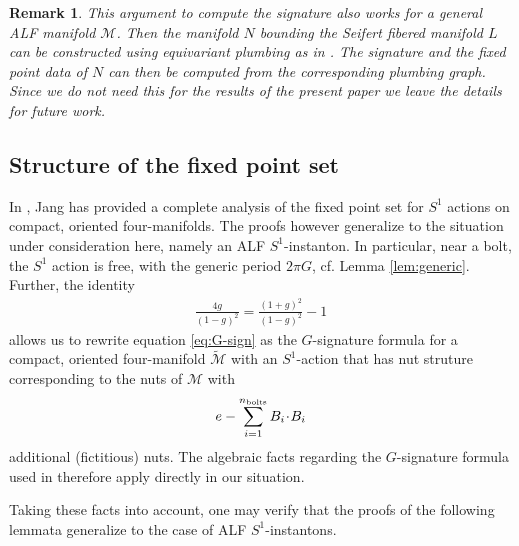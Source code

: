 \documentclass[a4paper,10pt,reqno]{amsart}
\newcommand{\bolt}{B}
\newcommand{\cM}{\mathcal{M}}
\theoremstyle{plain}
\newtheorem{remark}[thm]{Remark}
\newcommand{\nbolts}{n_{\text{\rm bolts}}}
\numberwithin{equation}{section}
\begin{document}
\begin{remark}
This argument to compute the signature also works for a general ALF manifold $\cM$. Then the manifold $N$ bounding the Seifert fibered manifold $L$ can be constructed using equivariant plumbing as in \cite[Chapter~2]{Orlik-seifert-manifolds}. The signature and the fixed point data of $N$ can then be computed from the corresponding plumbing graph. Since we do not need this for the results of the present paper we leave the details for future work.
\end{remark}

%


\subsection{Structure of the fixed point set} 
\label{sec:fps}
In \cite{2018JGP...133..181J}, Jang has provided a complete analysis of the fixed point set for $S^1$ actions on compact, oriented four-manifolds. The proofs however generalize to the situation under consideration here, namely an ALF $S^1$-instanton. In particular, 
%
near a bolt, the $S^1$ action is free, with the generic period $2\pi G$, cf. Lemma \ref{lem:generic}. Further, the identity 
\begin{align} 
\frac{4g}{(1-g)^2} = \frac{(1+g)^2}{(1-g)^2} - 1
\end{align} 
allows us to rewrite equation \eqref{eq:G-sign} as the $G$-signature formula for a compact, oriented four-manifold $\tilde{\cM}$ with an $S^1$-action that has nut struture corresponding to the nuts of $\cM$ with 
\begin{align} 
e-\sum_{i=1}^{\nbolts} \bolt_i \!\cdot\! \bolt_i
\end{align} 
additional (fictitious) nuts. The algebraic facts regarding the $G$-signature formula used in \cite{2018JGP...133..181J} therefore apply directly in our situation. 

Taking these facts into account, one may verify that the proofs of the following lemmata generalize to the case of ALF $S^1$-instantons. 
\end{document}

